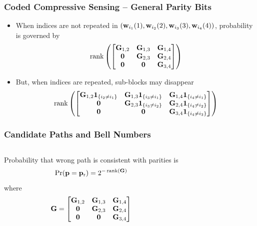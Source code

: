 \begin{frame}
\frametitle{Coded Compressive Sensing -- General Parity Bits}
\begin{center}

\end{center}
\begin{itemize}
\item When indices are not repeated in $(\mathbf{w}_{i_1}(1), \mathbf{w}_{i_2}(2), \mathbf{w}_{i_3}(3), \mathbf{w}_{i_4}(4))$, probability is governed by
\begin{equation*}
\operatorname{rank}
\left(
\begin{bmatrix}
\mathbf{G}_{1,2} & \mathbf{G}_{1,3} & \mathbf{G}_{1,4} \\
\mathbf{0} & \mathbf{G}_{2,3} & \mathbf{G}_{2,4} \\
\mathbf{0} & \mathbf{0}& \mathbf{G}_{3,4}
\end{bmatrix}
\right)
\end{equation*}
\item But, when indices are repeated, sub-blocks may disappear
\begin{equation*}
\operatorname{rank}
\left(
\begin{bmatrix}
\mathbf{G}_{1,2} \mathbf{1}_{\{ i_2 \neq i_1 \}} & \mathbf{G}_{1,3} \mathbf{1}_{\{ i_3 \neq i_1 \}} & \mathbf{G}_{1,4} \mathbf{1}_{\{ i_4 \neq i_1 \}} \\
\mathbf{0} & \mathbf{G}_{2,3} \mathbf{1}_{\{ i_3 \neq i_2 \}} & \mathbf{G}_{2,4} \mathbf{1}_{\{ i_4 \neq i_2 \}} \\
\mathbf{0} & \mathbf{0}& \mathbf{G}_{3,4} \mathbf{1}_{\{ i_4 \neq i_3 \}}
\end{bmatrix}
\right)
\end{equation*}
\end{itemize}
\end{frame}


\begin{frame}
\frametitle{Candidate Paths and Bell Numbers}
\begin{columns}
  
  Probability that wrong path is consistent with parities is
  \begin{equation*}
  \Pr (\mathbf{p} = \mathbf{p}_{\mathrm{r}}) = {2^{-\operatorname{rank}(\mathbf{G})}}
  \end{equation*}
  where
  \begin{equation*}
  \mathbf{G} = \begin{bmatrix}
  \mathbf{G}_{1,2} & \mathbf{G}_{1,3} & \mathbf{G}_{1,4} \\
  \mathbf{0} & \mathbf{G}_{2,3} & \mathbf{G}_{2,4} \\
  \mathbf{0} & \mathbf{0}& \mathbf{G}_{3,4}
  \end{bmatrix}
  \end{equation*}
\end{columns}
\vfill
\begin{center}
 \\[2mm]
\end{center}
\end{frame}

